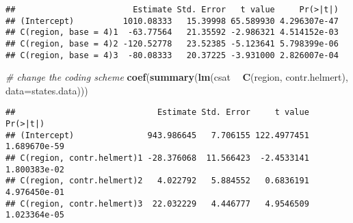 \documentclass[]{article}
\newenvironment{Shaded}{\begin{snugshade}}{\end{snugshade}}
\newcommand{\KeywordTok}[1]{\textcolor[rgb]{0.13,0.29,0.53}{\textbf{#1}}}
\newcommand{\DataTypeTok}[1]{\textcolor[rgb]{0.13,0.29,0.53}{#1}}
\newcommand{\StringTok}[1]{\textcolor[rgb]{0.31,0.60,0.02}{#1}}
\newcommand{\CommentTok}[1]{\textcolor[rgb]{0.56,0.35,0.01}{\textit{#1}}}
\newcommand{\OperatorTok}[1]{\textcolor[rgb]{0.81,0.36,0.00}{\textbf{#1}}}
\newcommand{\NormalTok}[1]{#1}
\begin{document}
\begin{verbatim}
##                        Estimate Std. Error   t value     Pr(>|t|)
## (Intercept)          1010.08333   15.39998 65.589930 4.296307e-47
## C(region, base = 4)1  -63.77564   21.35592 -2.986321 4.514152e-03
## C(region, base = 4)2 -120.52778   23.52385 -5.123641 5.798399e-06
## C(region, base = 4)3  -80.08333   20.37225 -3.931000 2.826007e-04
\end{verbatim}

\begin{Shaded}
\begin{Highlighting}[]
\CommentTok{# change the coding scheme}
\KeywordTok{coef}\NormalTok{(}\KeywordTok{summary}\NormalTok{(}\KeywordTok{lm}\NormalTok{(csat }\OperatorTok{~}\StringTok{ }\KeywordTok{C}\NormalTok{(region, contr.helmert),}
                \DataTypeTok{data=}\NormalTok{states.data)))}
\end{Highlighting}
\end{Shaded}

\begin{verbatim}
##                             Estimate Std. Error     t value     Pr(>|t|)
## (Intercept)               943.986645   7.706155 122.4977451 1.689670e-59
## C(region, contr.helmert)1 -28.376068  11.566423  -2.4533141 1.800383e-02
## C(region, contr.helmert)2   4.022792   5.884552   0.6836191 4.976450e-01
## C(region, contr.helmert)3  22.032229   4.446777   4.9546509 1.023364e-05
\end{verbatim}

\begin{Shaded}
\end{Shaded}
\end{document}
